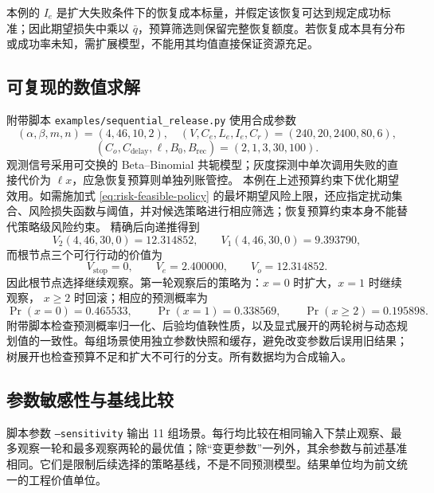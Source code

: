 \documentclass[11pt,a4paper]{ctexart}
\numberwithin{equation}{section}
\theoremstyle{definition}
\theoremstyle{plain}
\begin{document}
本例的 $I_e$ 是扩大失败条件下的恢复成本标量，并假定该恢复可达到规定成功标准；因此期望损失中乘以 $\bar q$，预算筛选则保留完整恢复额度。若恢复成本具有分布或成功率未知，需扩展模型，不能用其均值直接保证资源充足。

\subsection{可复现的数值求解}

附带脚本 \texttt{examples/sequential\_release.py} 使用合成参数
\[
(\alpha,\beta,m,n)=(4,46,10,2),
\quad
(V,C_e,L_e,I_e,C_r)=(240,20,2400,80,6),
\]
\[
(C_o,C_{\mathrm{delay}},\ell,B_0,B_{\mathrm{rec}})
=(2,1,3,30,100).
\]
观测信号采用可交换的 Beta--Binomial 共轭模型；灰度探测中单次调用失败的直接代价为 $\ell x$，应急恢复预算则单独列账管控。
本例在上述预算约束下优化期望效用。如需施加式 \eqref{eq:risk-feasible-policy} 的最坏期望风险上限，还应指定扰动集合、风险损失函数与阈值，并对候选策略进行相应筛选；恢复预算约束本身不能替代策略级风险约束。
精确后向递推得到
\[
V_2(4,46,30,0)=12.314852,
\qquad
V_1(4,46,30,0)=9.393790,
\]
而根节点三个可行行动的价值为
\[
V_{\mathrm{stop}}=0,\qquad V_e=2.400000,\qquad V_o=12.314852.
\]
因此根节点选择继续观察。第一轮观察后的策略为：$x=0$ 时扩大，$x=1$ 时继续观察，
$x\ge2$ 时回滚；相应的预测概率为
\[
\Pr(x=0)=0.465533,\qquad
\Pr(x=1)=0.338569,\qquad
\Pr(x\ge2)=0.195898.
\]
附带脚本检查预测概率归一化、后验均值鞅性质，以及显式展开的两轮树与动态规划值的一致性。每组场景使用独立参数快照和缓存，避免改变参数后误用旧结果；树展开也检查预算不足和扩大不可行的分支。所有数据均为合成输入。


\subsection{参数敏感性与基线比较}

脚本参数 \texttt{--sensitivity} 输出 11 组场景。每行均比较在相同输入下禁止观察、最多观察一轮和最多观察两轮的最优值；除“变更参数”一列外，其余参数与前述基准相同。它们是限制后续选择的策略基线，不是不同预测模型。结果单位均为前文统一的工程价值单位。
\end{document}
